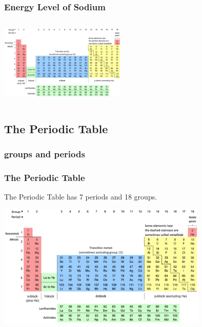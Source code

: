 \documentclass{beamer}
\begin{document}
\begin{frame}
    \frametitle{Energy Level of Sodium}
    \begin{columns}
        
        \begin{column}{0.5\textwidth}
            \includegraphics[width=6cm]{../../../../public/images/pTable.png}
            
        \end{column}
        \begin{column}{0.5\textwidth}
            
        \end{column}
    \end{columns}

\end{frame}



\subsection{The Periodic Table}

\subsubsection{groups and periods}

\begin{frame}
    \frametitle{The Periodic Table}

    \onslide The Periodic Table has
    \pause \alert{7}
    \onslide periods and 
    \pause \alert{18} 
    \onslide groups.
    
    \includegraphics[width=10cm]{../../../../public/images/pTable.png}

\end{frame}
\end{document}
